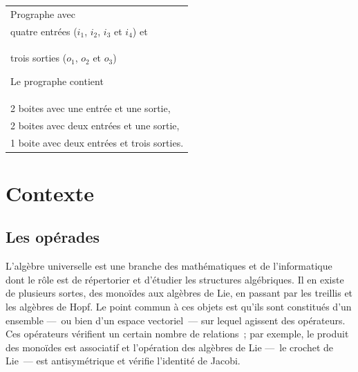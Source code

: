 \documentclass[10pt,reqno]{amsart}
\numberwithin{equation}{subsection}
\begin{document}
\begin{minipage}{0.45\textwidth}
\end{minipage}
\hfill
\begin{minipage}{0.45\textwidth}
\begin{tabular}{|p{\textwidth}}
\bigskip

Prographe avec \\
quatre entrées ($i_1$, $i_2$, $i_3$ et $i_4$) et \\
trois sorties ($o_1$, $o_2$ et $o_3$)

\bigskip

Le prographe contient \\
2 boites avec une entrée et une sortie, \\
2 boites avec deux entrées et une sortie, \\
1 boite avec deux entrées et trois sorties.
\bigskip
\end{tabular}
\end{minipage}



\section{Contexte}

\subsection{Les opérades}
L'algèbre universelle est une branche des mathématiques et de
l'informatique dont le rôle est de répertorier et d'étudier les
structures algébriques. Il en existe de plusieurs sortes, des monoïdes
aux algèbres de Lie, en passant par les treillis et les algèbres de Hopf.
Le point commun à ces objets est qu'ils sont constitués d'un ensemble
---~ou bien d'un espace vectoriel~--- sur lequel agissent des opérateurs.
Ces opérateurs vérifient un certain nombre de relations~; par exemple,
le produit des monoïdes est associatif et l'opération des algèbres de
Lie ---~le crochet de Lie~--- est antisymétrique et vérifie l'identité
de Jacobi.
\end{document}
